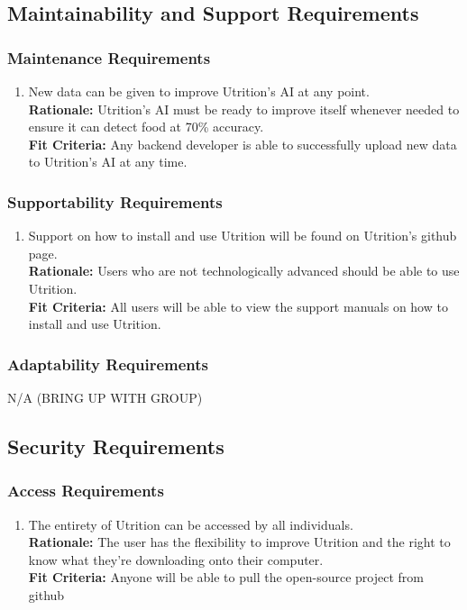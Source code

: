 \documentclass[12pt]{article}
\begin{document}
\subsection{Maintainability and Support Requirements}

\subsubsection{Maintenance Requirements}
\begin{enumerate}[{MS}1. ] 
	\item New data can be given to improve Utrition’s AI at any point.\\
	\textbf{Rationale:} Utrition’s AI must be ready to improve itself whenever needed to ensure it can detect food at 70\% accuracy.\\	
	\textbf{Fit Criteria:} Any backend developer is able to successfully upload new data to Utrition’s AI at any time. 
\end{enumerate}

\subsubsection{Supportability Requirements}
\begin{enumerate}[{MS}2. ] 
	\item Support on how to install and use Utrition will be found on Utrition’s github page. \\
	\textbf{Rationale:} Users who are not technologically advanced should be able to use Utrition.\\	
	\textbf{Fit Criteria:} All users will be able to view the support manuals on how to install and use Utrition.
\end{enumerate}

\subsubsection{Adaptability Requirements}
\hspace{1.5cm}N/A (BRING UP WITH GROUP) 

\subsection{Security Requirements}

\subsubsection{Access Requirements}
\begin{enumerate}[{SR}1. ] 
	\item The entirety of Utrition can be accessed by all individuals. \\
	\textbf{Rationale:} The user has the flexibility to improve Utrition and the right to know what they’re downloading onto their computer.  \\	
	\textbf{Fit Criteria:} Anyone will be able to pull the open-source project from github
\end{enumerate}
\end{document}
